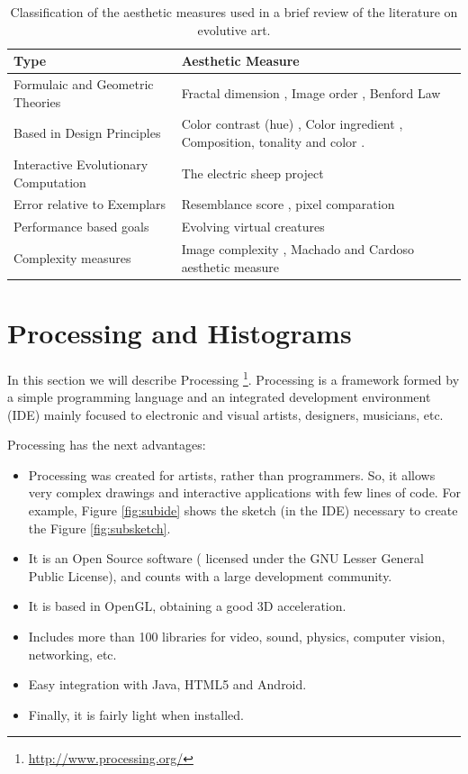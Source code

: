 \documentclass[conference]{IEEEtran}
\begin{document}
\begin{table}[!t] 
\renewcommand{\arraystretch}{1.3} 
\caption{Classification of the aesthetic measures used in a brief review of the literature on evolutive art.} 
\label{table_class} 
\centering
\begin{tabular}{|l|l|}
\hline
Type & Aesthetic Measure \\ \hline
Formulaic and Geometric Theories & Fractal dimension \cite{den2010comparing}, Image order \cite{li2012investigating}, Benford Law \cite{del2005benford}\\ \hline
Based in Design Principles &  Color contrast (hue) \cite{den2012evolving},  Color ingredient \cite{li2012investigating}, Composition, tonality and color \cite{dipaola2009incorporating}.\\ \hline
Interactive Evolutionary Computation & The electric sheep project \cite{draves2006electric} \\ \hline
Error relative to Exemplars &  Resemblance score \cite{dipaola2009incorporating}, pixel comparation \cite{aguilar2008robotic}\\ \hline
Performance based goals & Evolving virtual creatures \cite{sims1994evolving} \\\hline
Complexity measures & Image complexity \cite{li2012investigating}, Machado and Cardoso aesthetic measure \cite{machado1998computing}\\ \hline
\end{tabular}
\end{table}

\section{Processing and Histograms}
\label{sec:processing}
In this section we will describe Processing \footnote{\url{http://www.processing.org/}}. Processing \cite{PROCESSING} is a framework formed by a simple programming language and an integrated development environment (IDE) mainly focused to electronic and visual artists, designers, musicians, etc.

Processing has the next advantages:

\begin{itemize}
\item Processing was created for artists, rather than programmers. So, it allows very complex drawings and interactive applications with few lines of code. For example, Figure \ref{fig:subide} shows the sketch (in the IDE) necessary to create the Figure \ref{fig:subsketch}.
\item It is an Open Source software ( licensed under the GNU Lesser General Public License), and counts with a large development community.
\item It is based in OpenGL, obtaining a good 3D acceleration.
\item Includes more than 100 libraries for video, sound, physics, computer vision, networking, etc.
\item Easy integration with Java, HTML5 and Android.
\item Finally, it is fairly light when installed.
\end{itemize}
\end{document}
